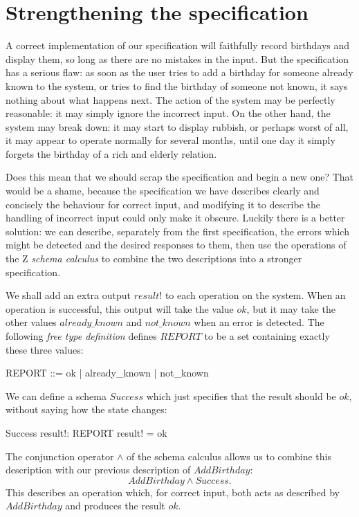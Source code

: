\documentclass{llncs}
\begin{document}
\section{Strengthening the specification}

A correct implementation of our specification will faithfully record
birthdays and display them, so long as there are no mistakes in the
input. But the specification has a serious flaw: as soon as the user
tries to add a birthday for someone already known to the system, or
tries to find the birthday of someone not known, it says nothing about
what happens next. The action of the system may be perfectly
reasonable: it may simply ignore the incorrect input. On the other
hand, the system may break down: it may start to display rubbish, or
perhaps worst of all, it may appear to operate normally for several
months, until one day it simply forgets the birthday of a rich and
elderly relation.

Does this mean that we should scrap the specification and begin a new
one? That would be a shame, because the specification we have
describes clearly and concisely the behaviour for correct input, and
modifying it to describe the handling of incorrect input could only
make it obscure.  Luckily there is a better solution: we can describe,
separately from the first specification, the errors which might be
detected and the desired responses to them, then use the operations of
the Z {\em schema calculus\/} to combine the two descriptions into a
stronger specification.

We shall add an extra output $result!$ to each operation on the
system.  When an operation is successful, this output will take the
value $ok$, but it may take the other values $already\_known$ and
$not\_known$ when an error is detected. The following {\em free type
definition\/} defines $REPORT$ to be a set
containing exactly these three values:

\begin{zed}
REPORT ::= ok | already\_known | not\_known
\end{zed}
We can define a schema $Success$ which just specifies that the
result should be $ok$, without saying how the state changes:
\begin{schema}{Success}
	result!: REPORT
\where
	result! = ok
\end{schema}
The conjunction operator $\land$ of the schema calculus allows us to
combine this description with our previous description of $AddBirthday$:
\[ AddBirthday \land Success. \]
This describes an operation which, for correct input, both acts as
described by $AddBirthday$ and produces the result $ok$.
\end{document}
